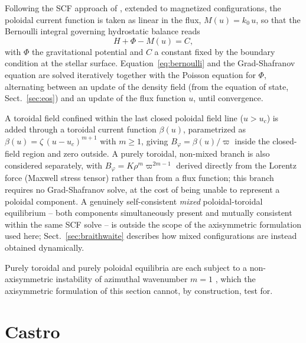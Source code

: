\documentclass{aa}
\begin{document}
Following the SCF approach of \citet{hachisu1986}, extended to
magnetized configurations, the poloidal current function is taken as
linear in the flux, $M(u) = k_0\,u$, so that the Bernoulli integral
governing hydrostatic balance reads
\begin{equation}
H + \Phi - M(u) = C,
\label{eq:bernoulli}
\end{equation}
with $\Phi$ the gravitational potential and $C$ a constant fixed by the
boundary condition at the stellar surface. Equation~\ref{eq:bernoulli}
and the Grad-Shafranov equation are solved iteratively together with
the Poisson equation for $\Phi$, alternating between an update of the
density field (from the equation of state, Sect.~\ref{sec:eos}) and an
update of the flux function $u$, until convergence.

A toroidal field confined within the last closed poloidal field line
($u > u_c$) is added through a toroidal current function $\beta(u)$,
parametrized as $\beta(u) = \zeta\,(u-u_c)^{m+1}$ with $m\ge1$, giving
$B_\varphi = \beta(u)/\varpi$ inside the closed-field region and zero
outside. A purely toroidal, non-mixed branch is also considered
separately, with $B_\varphi = K\rho^m\varpi^{2m-1}$ derived directly
from the Lorentz force (Maxwell stress tensor) rather than from a flux
function; this branch requires no Grad-Shafranov solve, at the cost of
being unable to represent a poloidal component. A genuinely
self-consistent \emph{mixed} poloidal-toroidal equilibrium -- both
components simultaneously present and mutually consistent within the
same SCF solve -- is outside the scope of the axisymmetric formulation
used here; Sect.~\ref{sec:braithwaite} describes how mixed
configurations are instead obtained dynamically.

Purely toroidal and purely poloidal equilibria are each subject to a
non-axisymmetric instability of azimuthal wavenumber $m=1$
\citep{tayler1973,markey1973}, which the axisymmetric formulation of
this section cannot, by construction, test for.


\section{Castro}
\label{sec:castro}
\end{document}
